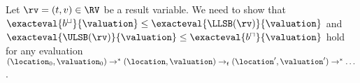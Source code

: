 Let $\rv = (t,v) \in \RV$ be a result variable.
We need to show that $\exacteval{b^\sqcup}{\valuation} \leq \exacteval{\LLSB(\rv)}{\valuation}$ and $\exacteval{\ULSB(\rv)}{\valuation} \leq \exacteval{b^\sqcap}{\valuation}$ hold for any evaluation $(\location_0, \valuation_0) \rightarrow^* (\location, \valuation) \rightarrow_t (\location', \valuation') \rightarrow^* \dots$.
